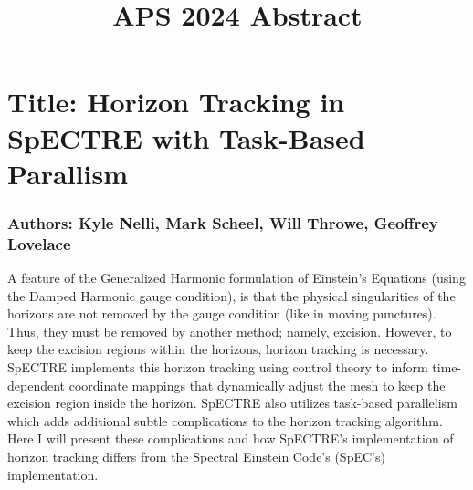\documentclass[12pt]{article}
\title{APS 2024 Abstract}
\author{\vspace{-5ex}}
\date{\vspace{-5ex}}
\begin{document}
\maketitle

\section*{Title: Horizon Tracking in SpECTRE with Task-Based Parallism}

\subsubsection*{Authors: Kyle Nelli, Mark Scheel, Will Throwe, Geoffrey Lovelace}

A feature of the Generalized Harmonic formulation of Einstein's Equations (using the Damped Harmonic gauge condition), is that the physical singularities of the horizons are not removed by the gauge condition (like in moving punctures). Thus, they must be removed by another method; namely, excision. However, to keep the excision regions within the horizons, horizon tracking is necessary. SpECTRE implements this horizon tracking using control theory to inform time-dependent coordinate mappings that dynamically adjust the mesh to keep the excision region inside the horizon. SpECTRE also utilizes task-based parallelism which adds additional subtle complications to the horizon tracking algorithm. Here I will present these complications and how SpECTRE's implementation of horizon tracking differs from the Spectral Einstein Code's (SpEC's) implementation.
\end{document}
